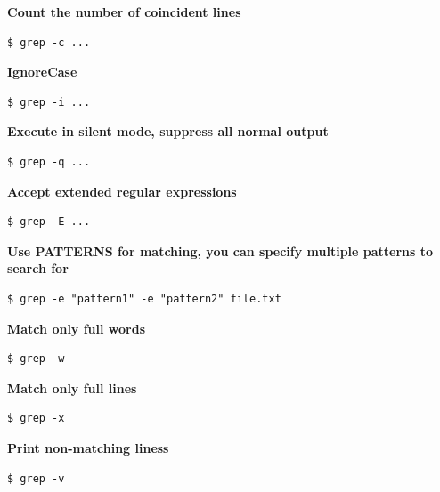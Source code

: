 \documentclass{article}
\newenvironment{codetemplate}[1][]{%
  \mybasecolorbox[#1]
  \itshape
}{%
  \endmybasecolorbox
}
\begin{document}
\textbf{Count the number of coincident lines}
\begin{codetemplate}{}
\begin{verbatim}
$ grep -c ...
\end{verbatim}
\end{codetemplate}

\textbf{IgnoreCase}
\begin{codetemplate}{}
\begin{verbatim}
$ grep -i ...
\end{verbatim}
\end{codetemplate}

\textbf{Execute in silent mode, suppress all normal output}
\begin{codetemplate}{}
\begin{verbatim}
$ grep -q ...
\end{verbatim}
\end{codetemplate}

\textbf{Accept extended regular expressions}
\begin{codetemplate}{}
\begin{verbatim}
$ grep -E ...
\end{verbatim}
\end{codetemplate}

\textbf{Use PATTERNS for matching, you can specify multiple patterns to search for}
\begin{codetemplate}{}
\begin{verbatim}
$ grep -e "pattern1" -e "pattern2" file.txt
\end{verbatim}
\end{codetemplate}

\textbf{Match only full words}
\begin{codetemplate}{}
\begin{verbatim}
$ grep -w
\end{verbatim}
\end{codetemplate}

\textbf{Match only full lines}
\begin{codetemplate}{}
\begin{verbatim}
$ grep -x
\end{verbatim}
\end{codetemplate}

\textbf{Print non-matching liness}
\begin{codetemplate}{}
\begin{verbatim}
$ grep -v
\end{verbatim}
\end{codetemplate}
\end{document}
